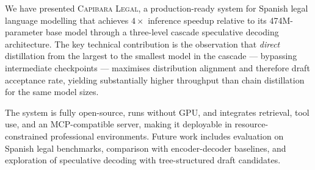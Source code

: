 \documentclass[11pt,a4paper]{article}
\newcommand{\modelname}{\textsc{Capibara Legal}}
\begin{document}
We have presented \modelname, a production-ready system for Spanish legal
language modelling that achieves $4\times$ inference speedup relative to its
474M-parameter base model through a three-level cascade speculative decoding
architecture. The key technical contribution is the observation that
\emph{direct} distillation from the largest to the smallest model in the
cascade — bypassing intermediate checkpoints — maximises distribution alignment
and therefore draft acceptance rate, yielding substantially higher throughput
than chain distillation for the same model sizes.

The system is fully open-source, runs without GPU, and integrates retrieval,
tool use, and an MCP-compatible server, making it deployable in resource-
constrained professional environments. Future work includes evaluation on
Spanish legal benchmarks, comparison with encoder-decoder baselines, and
exploration of speculative decoding with tree-structured draft candidates.
\end{document}

